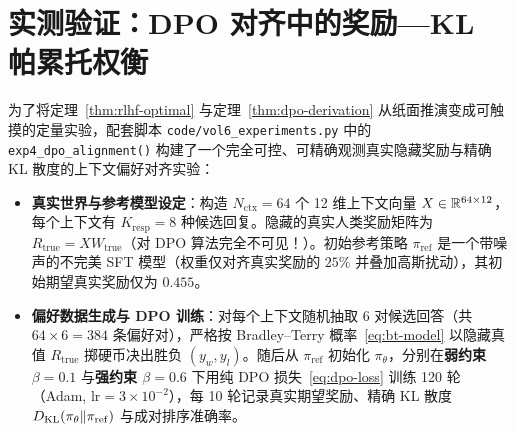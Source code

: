 \section{实测验证：DPO 对齐中的奖励—KL 帕累托权衡}
\label{sec:exp-dpo}

为了将定理~\ref{thm:rlhf-optimal} 与定理~\ref{thm:dpo-derivation} 从纸面推演变成可触摸的定量实验，配套脚本 \texttt{code/vol6\_experiments.py} 中的 \texttt{exp4\_dpo\_alignment()} 构建了一个完全可控、可精确观测真实隐藏奖励与精确 KL 散度的上下文偏好对齐实验：
\begin{itemize}
  \item \textbf{真实世界与参考模型设定}：构造 $N_{\mathrm{ctx}} = 64$ 个 12 维上下文向量 $X \in \mathbb{R}^{64 \times 12}$，每个上下文有 $K_{\mathrm{resp}} = 8$ 种候选回复。隐藏的真实人类奖励矩阵为 $R_{\mathrm{true}} = X W_{\mathrm{true}}$（对 DPO 算法完全不可见！）。初始参考策略 $\pi_{\mathrm{ref}}$ 是一个带噪声的不完美 SFT 模型（权重仅对齐真实奖励的 $25\%$ 并叠加高斯扰动），其初始期望真实奖励仅为 \textbf{$0.455$}。
  \item \textbf{偏好数据生成与 DPO 训练}：对每个上下文随机抽取 6 对候选回答（共 $64 \times 6 = 384$ 条偏好对），严格按 Bradley--Terry 概率~\eqref{eq:bt-model} 以隐藏真值 $R_{\mathrm{true}}$ 掷硬币决出胜负 $(y_w, y_l)$。随后从 $\pi_{\mathrm{ref}}$ 初始化 $\pi_\theta$，分别在\textbf{弱约束 $\beta = 0.1$} 与\textbf{强约束 $\beta = 0.6$} 下用纯 DPO 损失~\eqref{eq:dpo-loss} 训练 120 轮（Adam, $\text{lr}=3\times 10^{-2}$），每 10 轮记录真实期望奖励、精确 KL 散度 $D_{\mathrm{KL}}(\pi_\theta \| \pi_{\mathrm{ref}})$ 与成对排序准确率。
\end{itemize}


